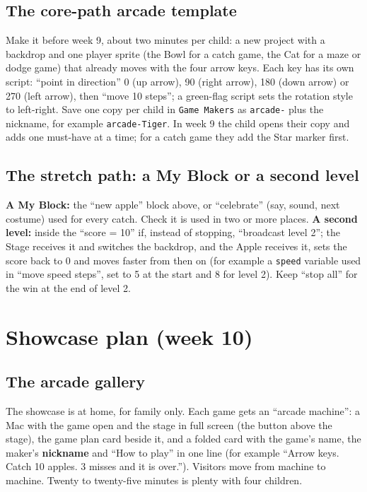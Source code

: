 \documentclass[track=junior,level=2,teacher]{kidscode}
\begin{document}
\subsection{The core-path arcade template}
Make it before week 9, about two minutes per child: a new project with a backdrop and one player sprite
(the Bowl for a catch game, the Cat for a maze or dodge game) that already moves with the four arrow
keys. Each key has its own script: \enquote{point in direction} 0 (up arrow), 90 (right arrow), 180
(down arrow) or 270 (left arrow), then \enquote{move 10 steps}; a green-flag script sets the rotation
style to left-right. Save one copy per child in \texttt{Game Makers} as \texttt{arcade-} plus the
nickname, for example \texttt{arcade-Tiger}. In week 9 the child opens their copy and adds one
must-have at a time; for a catch game they add the Star marker first.

\subsection{The stretch path: a My Block or a second level}
\textbf{A My Block:} the \enquote{new apple} block above, or \enquote{celebrate} (say, sound, next
costume) used for every catch. Check it is used in two or more places. \textbf{A second level:} inside
the \enquote{score = 10} if, instead of stopping, \enquote{broadcast level 2}; the Stage receives it and
switches the backdrop, and the Apple receives it, sets the score back to 0 and moves faster from then on
(for example a \texttt{speed} variable used in \enquote{move speed steps}, set to 5 at the start and 8
for level 2). Keep \enquote{stop all} for the win at the end of level 2.

\section{Showcase plan (week 10)}

\subsection{The arcade gallery}
The showcase is at home, for family only. Each game gets an \enquote{arcade machine}: a Mac with the
game open and the stage in full screen (the button above the stage), the game plan card beside it,
and a folded card with the game's name, the maker's \textbf{nickname} and \enquote{How to play} in one
line (for example \enquote{Arrow keys. Catch 10 apples. 3 misses and it is over.}). Visitors move from
machine to machine. Twenty to twenty-five minutes is plenty with four children.
\end{document}
